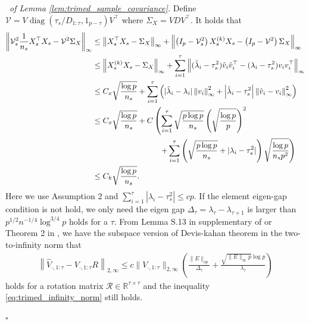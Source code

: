 \documentclass[12pt]{article}
\newenvironment{pf}{{\noindent \it Proof}\ }{\hfill $\square$\par}
\begin{document}
\begin{pf}{\it of Lemma \ref{lem:trimed_sample_covariance}. }
Define $\mathcal{V} = V\operatorname{diag}(\tau_s/D_{1:\tau},1_{p-\tau})V^\top$ where $\Sigma_X = VDV^\top$. It holds that
\begin{align}
    \left\|\mathcal{V}^2_s \frac{1}{n_s}X_s^{\top}X_s - \mathcal{V}^2\Sigma_X\right\|_{\infty} 
    &\le 
    \left\| X_s^\top X_s - \Sigma_X\right\|_{\infty} + \left\|\left(I_p - \mathcal{V}^2_s\right) X_s^{(k)}X_s - \left(I_p - \mathcal{V}^2\right)\Sigma_X\right\|_{\infty}\notag
    \\&\le  
    \left\| X_s^{(k)}X_s - \Sigma_X\right\|_{\infty} + \sum_{i=1}^\tau \left\|(\hat{\lambda}_i - \tau_s^2)\hat{v}_i\hat{v}^\top_i - (\lambda_i -\tau_s^2)v_iv^\top_i\right\|_{\infty}\notag
    \\&\le 
    C_x\sqrt{\frac{\log p}{n_s}} + \sum_{i=1}^\tau \left(|\hat{\lambda}_i - \lambda_i|\left\|v_{i}\right\|^2_{\infty} +\left|\hat{\lambda}_i-\tau_s^2\right|\left\|\hat{v}_{i} -v_i\right\|^2_{\infty}\right)\notag
    \\&\le 
    C_x\sqrt{\frac{\log p}{n_s}} + C\left(\sum_{i=1}^\tau \sqrt{\frac{p \log p}{n_s}}\left(\sqrt{\frac{\log p}{p}}\right)^2 \right.\notag\\& \left.\hspace{3cm}+ \sum_{i=1}^\tau \left(\sqrt{\frac{p \log p}{n_s}} + |\lambda_i-\tau_s^2|\right)\sqrt{\frac{\log p}{n_s p^2}}\right)\notag
    \\& \le 
     C_k\sqrt{\frac{\log p}{n_s}}\label{eq:trimed_infinity_norm}. 
\end{align}
Here we use Assumption 2 and $\sum_{i=1}^\tau |\lambda_i - \tau_s^2|\le c p$. If the element eigen-gap condition is not hold, we only need the eigen gap $\Delta_\tau = \lambda_\tau - \lambda_{\tau+1}$ is larger than $p^{1/2}n^{-1/4}\log^{3/4} p $ holds for a $\tau$. From Lemma S.13 in supplementary of \cite{chen2024matrix} or Theorem 2 in \cite{pensky2024davis}, we have the subspace version of Devis-kahan theorem in the two-to-infinity norm that 
\begin{align*}
    \left\|\hat{V}_{\cdot,1:\tau} - V_{\cdot,1:\tau}R\right\|_{2,\infty} \le c\|V_{\cdot,1:\tau}\|_{2,\infty}\left(\frac{\|E\|_{op}}{\Delta_\tau} +\frac{\sqrt{\|E\|_{\infty}p}\log p }{\lambda_\tau}\right)
\end{align*}
 holds for a rotation matrix $\mathcal{R}\in \mathbb{R}^{\tau\times \tau}$ and the inequality \eqref{eq:trimed_infinity_norm} still holds. 


\end{pf}
\end{document}
